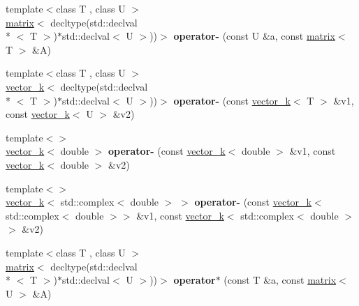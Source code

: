 \begin{DoxyCompactItemize}
\item 
\hypertarget{namespacekeycpp_a4bc853f9410d964ef9f163ce53ea4828}{{\footnotesize template$<$class T , class U $>$ }\\\hyperlink{classkeycpp_1_1matrix}{matrix}$<$ decltype(std\-::declval\\*
$<$ T $>$)$\ast$std\-::declval$<$ U $>$))$>$ {\bfseries operator-\/} (const U \&a, const \hyperlink{classkeycpp_1_1matrix}{matrix}$<$ T $>$ \&A)}\label{namespacekeycpp_a4bc853f9410d964ef9f163ce53ea4828}

\item 
\hypertarget{namespacekeycpp_a891589b60d1c968b44986f3b7d56586b}{{\footnotesize template$<$class T , class U $>$ }\\\hyperlink{classkeycpp_1_1vector__k}{vector\-\_\-k}$<$ decltype(std\-::declval\\*
$<$ T $>$)$\ast$std\-::declval$<$ U $>$))$>$ {\bfseries operator-\/} (const \hyperlink{classkeycpp_1_1vector__k}{vector\-\_\-k}$<$ T $>$ \&v1, const \hyperlink{classkeycpp_1_1vector__k}{vector\-\_\-k}$<$ U $>$ \&v2)}\label{namespacekeycpp_a891589b60d1c968b44986f3b7d56586b}

\item 
\hypertarget{namespacekeycpp_a2a6e4104db7159c74673aacae14286ef}{{\footnotesize template$<$$>$ }\\\hyperlink{classkeycpp_1_1vector__k}{vector\-\_\-k}$<$ double $>$ {\bfseries operator-\/} (const \hyperlink{classkeycpp_1_1vector__k}{vector\-\_\-k}$<$ double $>$ \&v1, const \hyperlink{classkeycpp_1_1vector__k}{vector\-\_\-k}$<$ double $>$ \&v2)}\label{namespacekeycpp_a2a6e4104db7159c74673aacae14286ef}

\item 
\hypertarget{namespacekeycpp_a95c0f9757ba86c696c6c5bfa874c8a49}{{\footnotesize template$<$$>$ }\\\hyperlink{classkeycpp_1_1vector__k}{vector\-\_\-k}$<$ std\-::complex$<$ double $>$ $>$ {\bfseries operator-\/} (const \hyperlink{classkeycpp_1_1vector__k}{vector\-\_\-k}$<$ std\-::complex$<$ double $>$$>$ \&v1, const \hyperlink{classkeycpp_1_1vector__k}{vector\-\_\-k}$<$ std\-::complex$<$ double $>$$>$ \&v2)}\label{namespacekeycpp_a95c0f9757ba86c696c6c5bfa874c8a49}

\item 
\hypertarget{namespacekeycpp_a8d5dbf37b71d16d686dd0fdbad82f8fb}{{\footnotesize template$<$class T , class U $>$ }\\\hyperlink{classkeycpp_1_1matrix}{matrix}$<$ decltype(std\-::declval\\*
$<$ T $>$)$\ast$std\-::declval$<$ U $>$))$>$ {\bfseries operator$\ast$} (const T \&a, const \hyperlink{classkeycpp_1_1matrix}{matrix}$<$ U $>$ \&A)}\label{namespacekeycpp_a8d5dbf37b71d16d686dd0fdbad82f8fb}


\end{DoxyCompactItemize}
